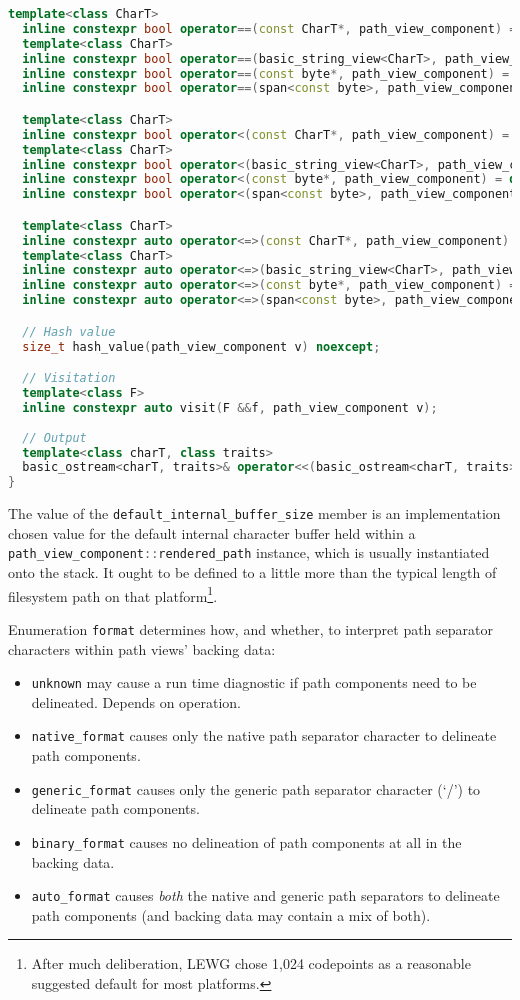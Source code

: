 \documentclass[11pt]{article}
\newcommand{\code}[2][cpp]{\lstinline[language=#1,basicstyle=\small\ttfamily]{#2}}
\begin{document}
\begin{lstlisting}[language=cpp]
  template<class CharT>
  inline constexpr bool operator==(const CharT*, path_view_component) = delete;
  template<class CharT>
  inline constexpr bool operator==(basic_string_view<CharT>, path_view_component) = delete;
  inline constexpr bool operator==(const byte*, path_view_component) = delete;
  inline constexpr bool operator==(span<const byte>, path_view_component) = delete;

  template<class CharT>
  inline constexpr bool operator<(const CharT*, path_view_component) = delete;
  template<class CharT>
  inline constexpr bool operator<(basic_string_view<CharT>, path_view_component) = delete;
  inline constexpr bool operator<(const byte*, path_view_component) = delete;
  inline constexpr bool operator<(span<const byte>, path_view_component) = delete;

  template<class CharT>
  inline constexpr auto operator<=>(const CharT*, path_view_component) = delete;
  template<class CharT>
  inline constexpr auto operator<=>(basic_string_view<CharT>, path_view_component) = delete;
  inline constexpr auto operator<=>(const byte*, path_view_component) = delete;
  inline constexpr auto operator<=>(span<const byte>, path_view_component) = delete;

  // Hash value
  size_t hash_value(path_view_component v) noexcept;

  // Visitation
  template<class F>
  inline constexpr auto visit(F &&f, path_view_component v);
  
  // Output
  template<class charT, class traits>
  basic_ostream<charT, traits>& operator<<(basic_ostream<charT, traits>& os, path_view_component v);
}
\end{lstlisting}

The value of the \code{default_internal_buffer_size} member is an implementation chosen value for the default internal character buffer held within a \code{path_view_component::rendered_path} instance, which is usually instantiated onto the stack. It ought to be defined to a little more than the typical length of filesystem path on that platform\footnote{After much deliberation, LEWG chose 1,024 codepoints as a reasonable suggested default for most platforms.}.

Enumeration \code{format} determines how, and whether, to interpret path separator characters within path views' backing data:
\begin{itemize}
    \item \code{unknown} may cause a run time diagnostic if path components need to be delineated. Depends on operation.
    \item \code{native_format} causes only the native path separator character to delineate path components.
    \item \code{generic_format} causes only the generic path separator character (`/') to delineate path components.
    \item \code{binary_format} causes no delineation of path components at all in the backing data.
    \item \code{auto_format} causes \emph{both} the native and generic path separators to delineate path components (and backing data may contain a mix of both).
\end{itemize}
\end{document}
